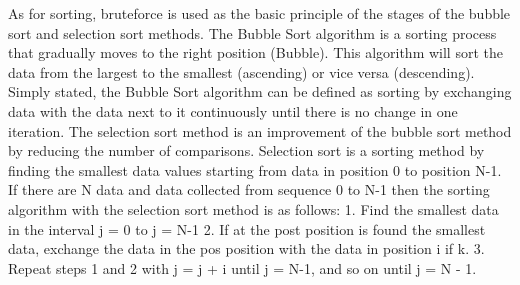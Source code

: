 \documentclass[12pt,titlepage]{article}
\begin{document}
As for sorting, bruteforce is used as the basic principle of the stages of the bubble sort and selection sort methods. The Bubble Sort algorithm is a sorting process that gradually moves to the right position (Bubble). This algorithm will sort the data from the largest to the smallest (ascending) or vice versa (descending). Simply stated, the Bubble Sort algorithm can be defined as sorting by exchanging data with the data next to it continuously until there is no change in one iteration. The selection sort method is an improvement of the bubble sort method by reducing the number of comparisons. Selection sort is a sorting method by finding the smallest data values starting from data in position 0 to position N-1. If there are N data and data collected from sequence 0 to N-1 then the sorting algorithm with the selection sort method is as follows: 1. Find the smallest data in the interval j = 0 to j = N-1 2. If at the post position is found the smallest data, exchange the data in the pos position with the data in position i if k. 3. Repeat steps 1 and 2 with j = j + i until j = N-1, and so on until j = N - 1.
\end{document}
